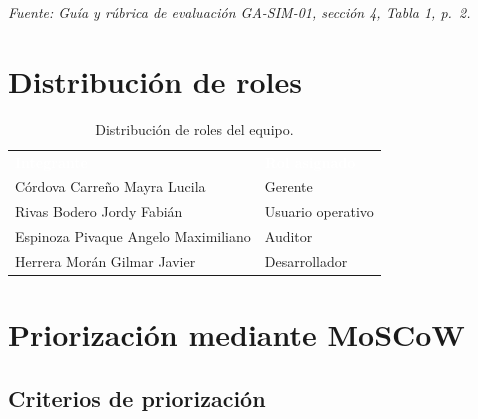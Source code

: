 \documentclass[12pt,a4paper]{article}
\newcommand{\cabecera}[1]{
    \textcolor{white}{\textbf{#1}}
}
\begin{document}
\noindent
{\footnotesize\textit{Fuente: Guía y rúbrica de evaluación
GA-SIM-01, sección 4, Tabla 1, p.~2.}}

\endgroup


\section{Distribución de roles}

\begin{table}[htbp]

    \centering

    \begin{tabularx}{\textwidth}{Y L{4cm}}


        \cabecera{Integrante} &
        \cabecera{Rol asignado} \\

        Córdova Carreño Mayra Lucila &
        Gerente \\

        Rivas Bodero Jordy Fabián &
        Usuario operativo \\

        Espinoza Pivaque Angelo Maximiliano &
        Auditor \\

        Herrera Morán Gilmar Javier &
        Desarrollador \\

        \bottomrule

    \end{tabularx}

    \caption{Distribución de roles del equipo.}

\end{table}


\section{Priorización mediante MoSCoW}

\subsection{Criterios de priorización}
\end{document}
